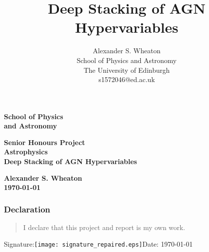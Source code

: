 \documentclass[a4paper,11pt]{article}
\title{Deep Stacking of AGN Hypervariables}
\author{
    Alexander S. Wheaton\\
    School of Physics and Astronomy\\
    The University of Edinburgh\\
    s1572046@ed.ac.uk\break
}
\begin{document}
\pagestyle{empty}                       %
\epsfxsize=40mm                         %
\begin{minipage}[b]{110mm}
    {\Huge\bf School of Physics\\ and Astronomy
    \vspace*{17mm}}
\end{minipage}
\hfill
\begin{minipage}[t]{40mm}
\end{minipage}
\par\noindent                                           %
\vspace*{2cm}
\begin{center}
    \Large\bf \Large\bf Senior Honours Project\\
    \Large\bf Astrophysics\\[10pt]                     %
    \LARGE\bf Deep Stacking of AGN Hypervariables
\end{center}
\vspace*{0.5cm}
\begin{center}
    \bf Alexander S. Wheaton\\
    \today
\end{center}
\vspace*{5mm}

\begin{abstract}
        \lipsum[1]
\end{abstract}

\vspace*{1cm}

\subsubsection*{Declaration}
\begin{quotation}
        I declare that this project and report is my own work.
\end{quotation}

\hspace*{1cm}Signature:\hspace*{1cm}\texttt{[image: signature\_repaired.eps]}\hspace*{1cm}Date: \today
\end{document}
